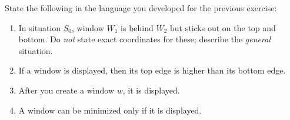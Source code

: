 \begin{iexercise}
State the following in the language you developed for the previous exercise:
\begin{enumerate}
\item
In situation $S_0$,
window $W_1$ is behind $W_2$ but sticks out on the top and bottom.  Do {\em not\/} state exact coordinates for these;
describe the {\em general} situation.
\item
If a window is displayed, then its top edge is higher than its bottom edge.
\item
After you create a  window $w$, it is displayed.
\item
A window can be minimized only if it is displayed.
\end{enumerate}
\end{iexercise} 

